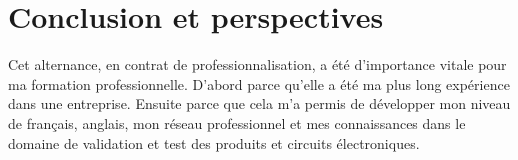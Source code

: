 \chapter*{Conclusion et perspectives}
\label{sec:conclusion}

    Cet alternance, en contrat de professionnalisation, a été d'importance vitale pour ma formation professionnelle. D'abord parce qu'elle a été ma plus long expérience dans une entreprise. Ensuite parce que cela m'a permis de développer mon niveau de français, anglais, mon réseau professionnel et mes connaissances dans le domaine de validation et test des produits et circuits électroniques.



